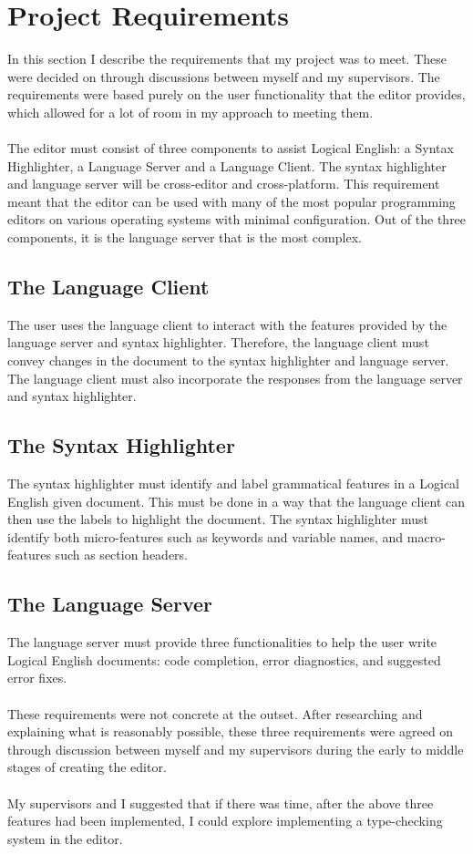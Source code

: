 \documentclass[../main.tex]{subfiles}
\begin{document}
\chapter{Project Requirements}
In this section I describe the requirements that my project was to meet. These were decided on through discussions between myself and my supervisors. The requirements were based purely on the user functionality that the editor provides, which allowed for a lot of room in my approach to meeting them.
\\
\\
The editor must consist of three components to assist Logical English: a Syntax Highlighter, a Language Server and a Language Client. The syntax highlighter and language server will be cross-editor and cross-platform. This requirement meant that the editor can be used with many of the most popular programming editors on various operating systems with minimal configuration. Out of the three components, it is the language server that is the most complex.

\section{The Language Client}
The user uses the language client to interact with the features provided by the language server and syntax highlighter. Therefore, the language client must convey changes in the document to the syntax highlighter and language server. The language client must also incorporate the responses from the language server and syntax highlighter.

\section{The Syntax Highlighter}
The syntax highlighter must identify and label grammatical features in a Logical English given document. This must be done in a way that the language client can then use the labels to highlight the document. The syntax highlighter must identify both micro-features such as keywords and variable names, and macro-features such as section headers.

\section{The Language Server}
The language server must provide three functionalities to help the user write Logical English documents: code completion, error diagnostics, and suggested error fixes. 
\\ 
\\
These requirements were not concrete at the outset. After researching and explaining what is reasonably possible, these three requirements were agreed on through discussion between myself and my supervisors during the early to middle stages of creating the editor. 
\\
\\
My supervisors and I suggested that if there was time, after the above three features had been implemented, I could explore implementing a type-checking system in the editor.
\end{document}
